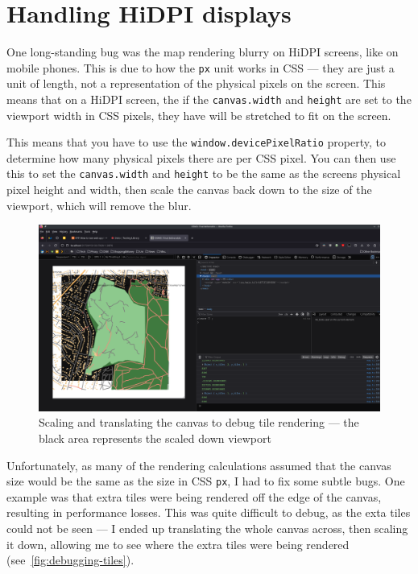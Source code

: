 \documentclass[hyphens]{final_report}
\begin{document}
\section{Handling HiDPI displays}

One long-standing bug was the map rendering blurry on HiDPI screens, like on mobile phones. This is due to how the \texttt{px} unit works in CSS --- they are just a unit of length, not a representation of the physical pixels on the screen. This means that on a HiDPI screen, the if the \texttt{canvas.width} and \texttt{height} are set to the viewport width in CSS pixels, they have will be stretched to fit on the screen.

This means that you have to use the \texttt{window.devicePixelRatio} property, to determine how many physical pixels there are per CSS pixel. You can then use this to set the \texttt{canvas.width} and \texttt{height} to be the same as the screens physical pixel height and width, then scale the canvas back down to the size of the viewport, which will remove the blur.

\begin{figure}[ht]
    \centering
    \includegraphics[width=\textwidth]{images/debugging-tiles.png}
    \caption{Scaling and translating the canvas to debug tile rendering --- the black area represents the scaled down viewport}\label{fig:debugging-tiles}
\end{figure}

Unfortunately, as many of the rendering calculations assumed that the canvas size would be the same as the size in CSS \texttt{px}, I had to fix some subtle bugs. One example was that extra tiles were being rendered off the edge of the canvas, resulting in performance losses. This was quite difficult to debug, as the exta tiles could not be seen --- I ended up translating the whole canvas across, then scaling it down, allowing me to see where the extra tiles were being rendered (see~\autoref{fig:debugging-tiles}). 
\end{document}
